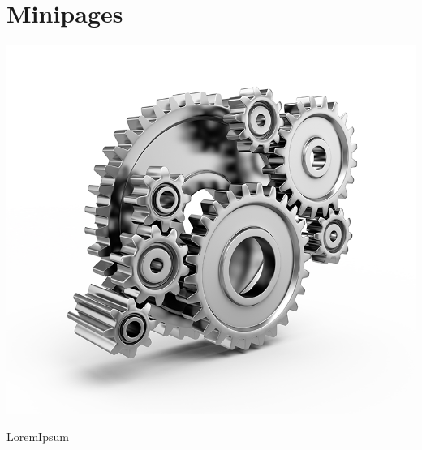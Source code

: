 \documentclass[11pt]{article}
\begin{document}
\section{Minipages}
\noindent
\begin{minipage}[c]{0.4\linewidth}
	\centering
	\includegraphics[width=0.9\linewidth]{Src/Images/image.png}
\end{minipage} \hfill
\begin{minipage}[c]{.5\linewidth}
	\centering
	LoremIpsum
\end{minipage} 
\end{document}
